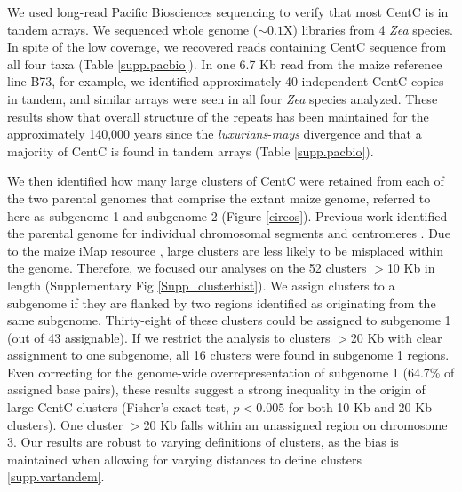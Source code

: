 We used long-read Pacific Biosciences sequencing to verify that most CentC is in tandem arrays. 
We sequenced whole genome ($\sim 0.1$X) libraries from 4 \emph{Zea} species.  
In spite of the low coverage, we recovered reads containing CentC sequence from all four taxa (Table \ref{supp.pacbio}).  
In one 6.7 Kb read from the maize reference line B73, for example, we identified approximately 40 independent CentC copies in tandem, and similar arrays were seen in all four \emph{Zea} species analyzed.  
These results show that overall structure of the repeats has been maintained for the approximately 140,000 years since the \emph{luxurians}-\emph{mays} divergence \citep{Hanson1996,  Ross-Ibarra2009} and that a majority of CentC is found in tandem arrays (Table \ref{supp.pacbio}).

We then identified how many large clusters of CentC were retained from each of the two parental genomes that comprise the extant maize genome, referred to here as subgenome 1 and subgenome 2 (Figure \ref{circos}).  
Previous work identified the parental genome for individual chromosomal segments \citep{Schnable2011} and centromeres \citep{Wang2012}.  
Due to the maize iMap resource \citep{zhou2009single}, large clusters are less likely to be misplaced within the genome.
Therefore, we focused our analyses on the 52 clusters $>$10 Kb in length (Supplementary Fig \ref{Supp_clusterhist}).
We assign clusters to a subgenome if they are flanked by two regions identified as originating from the same  subgenome.  
Thirty-eight of these clusters could be assigned to subgenome 1 (out of 43 assignable).
If we restrict the analysis to clusters  $>$20 Kb with clear assignment to one subgenome, all 16 clusters were found in subgenome 1 regions.  
Even correcting for the genome-wide overrepresentation of subgenome 1 (64.7\% of assigned base pairs), these results suggest a strong inequality in the origin of large CentC clusters (Fisher's exact test, $p<0.005$ for both 10 Kb and 20 Kb clusters).
One cluster $>$20 Kb falls within an unassigned region on chromosome 3.
Our results are robust to varying definitions of clusters, as the bias is maintained when allowing for varying distances to define clusters \ref{supp.vartandem}.

